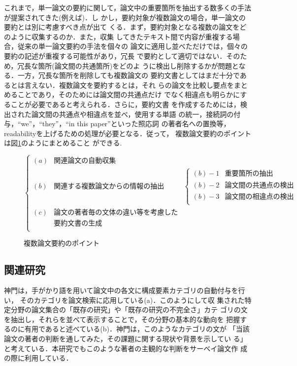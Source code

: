これまで，単一論文の要約に関して，論文中の重要箇所を抽出する数多くの手法
が提案されてきた(例えば\cite{Edmundson69,Kupiec95,Teufel97,Mani98})．し
かし，要約対象が複数論文の場合，単一論文の要約とは別に考慮すべき点が出て
くる．まず，要約対象となる複数の論文をどのように収集するのか．また，収集
してきたテキスト間で内容が重複する場合，従来の単一論文要約の手法を個々の
論文に適用し並べただけでは，個々の要約の記述が重複する可能性があり，冗長
で要約として適切ではない．そのため，冗長な箇所(論文間の共通箇所)をどのよ
うに検出し削除するかが問題となる．一方，冗長な箇所を削除しても複数論文の
要約文書としてはまだ十分であるとは言えない．複数論文を要約するとは，それ
らの論文を比較し要点をまとめることであり，そのためには論文間の共通点だけ
でなく相違点も明らかにすることが必要であると考えられる．さらに，要約文書
を作成するためには，検出された論文間の共通点や相違点を並べ，使用する単語
の統一，接続詞の付与，``we''，``they''，``in this paper''といった照応詞
の著者名への置換等，readabilityを上げるための処理が必要となる．従って，
複数論文要約のポイントは図\ref{fig:multi-paper-sum}のようにまとめること
ができる.

\vspace{-0.3cm}

\begin{figure}[h]
\[
\left\{ 
 \begin{array}{lll}
  (a) & 関連論文の自動収集 & \\
  (b) & 関連する複数論文からの情報の抽出 & 
\left\{ 
 \begin{array}{ll}
  (b)-1 & 重要箇所の抽出\\
  (b)-2 & 論文間の共通点の検出\\
  (b)-3 & 論文間の相違点の検出\\
 \end{array}
\right.
\\
  (c) & 論文の著者毎の文体の違い等を考慮した & \\
 & 要約文書の生成 & \\
 \end{array}
\right.
\]
\caption{複数論文要約のポイント\label{fig:multi-paper-sum}}
\end{figure}

\vspace{-0.3cm}

\subsection{関連研究}

神門は，手がかり語を用いて論文中の各文に構成要素カテゴリの自動付与を行い，
そのカテゴリを論文検索に応用している\cite{Kando97}(a)．このようにして収
集された特定分野の論文集合の「既存の研究」や「既存の研究の不完全さ」カテ
ゴリの文を抽出し，それらを並べて表示することで，その分野の基本的な動向を
把握するのに有用であると述べている(b)．神門は，このようなカテゴリの文が
「当該論文の著者の判断を通してみた，その課題に関する現状や背景を示してい
る」と考えている．本研究でもこのような著者の主観的な判断をサーベイ論文作
成の際に利用している．



